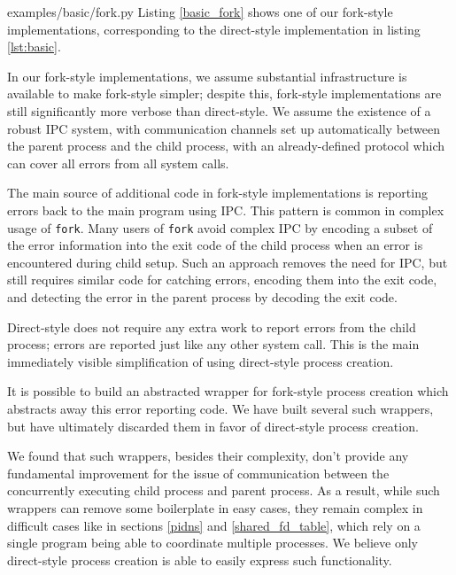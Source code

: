 \documentclass[letterpaper,twocolumn,10pt]{article}
\begin{document}

{examples/basic/fork.py}
Listing \ref{basic_fork} shows one of our fork-style implementations,
corresponding to the direct-style implementation in listing \ref{lst:basic}.

In our fork-style implementations,
we assume substantial infrastructure is available to make fork-style simpler;
despite this, fork-style implementations are still significantly more verbose than direct-style.
We assume the existence of a robust IPC system,
with communication channels set up automatically between the parent process and the child process,
with an already-defined protocol which can cover all errors from all system calls.

The main source of additional code in fork-style implementations
is reporting errors back to the main program using IPC.
This pattern is common in complex usage of \texttt{fork}.\cite{posix_spawn_error_pipe}\cite{python_subprocess_errpipe}
Many users of \texttt{fork} avoid complex IPC
by encoding a subset of the error information into the exit code of the child process
when an error is encountered during child setup.
Such an approach removes the need for IPC,
but still requires similar code for catching errors, encoding them into the exit code,
and detecting the error in the parent process by decoding the exit code.

Direct-style does not require any extra work to report errors from the child process;
errors are reported just like any other system call.
This is the main immediately visible simplification of using direct-style process creation.

It is possible to build an abstracted wrapper for fork-style process creation
which abstracts away this error reporting code.
We have built several such wrappers,
but have ultimately discarded them in favor of direct-style process creation.\cite{sfork}

We found that such wrappers, besides their complexity,
don't provide any fundamental improvement
for the issue of communication between the concurrently executing child process and parent process.
As a result, while such wrappers can remove some boilerplate in easy cases,
they remain complex in difficult cases like in sections \ref{pidns} and \ref{shared_fd_table},
which rely on a single program being able to coordinate multiple processes.
We believe only direct-style process creation is able to easily express such functionality.
\end{document}
